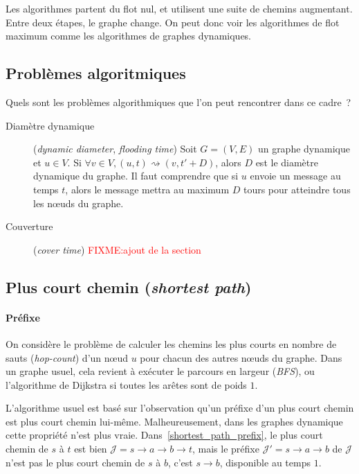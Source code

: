 \documentclass[12pt,a4paper]{article}
\begin{document}
Les algorithmes partent du flot nul, et utilisent une suite de chemins
augmentant. Entre deux étapes, le graphe change. On peut donc voir les
algorithmes de flot maximum comme les algorithmes de graphes
dynamiques.

\subsection{Problèmes algoritmiques}

Quels sont les problèmes algorithmiques que l'on peut rencontrer dans
ce cadre~?

\begin{description}
\item[Diamètre dynamique] (\textit{dynamic diameter}, \textit{flooding
    time}) Soit \(G = (V, E)\) un graphe dynamique et \(u \in V\). Si
  \(\forall v \in V, (u, t) \rightsquigarrow (v, t' + D)\), alors
  \(D\) est le diamètre dynamique du graphe. Il faut comprendre que si
  \(u\) envoie un message au temps \(t\), alors le message mettra au
  maximum \(D\) tours pour atteindre tous les nœuds du graphe.
\item[Couverture] (\textit{cover time}) \textcolor{red}{FIXME:\@ ajout
    de la section}
\end{description}

\subsection{Plus court chemin (\textit{shortest path})}

\paragraph{Préfixe}
On considère le problème de calculer les chemins les plus courts en
nombre de sauts (\textit{hop-count}) d'un nœud \(u\) pour chacun des
autres nœuds du graphe. Dans un graphe usuel, cela revient à exécuter
le parcours en largeur (\textit{BFS}), ou l'algorithme de Dijkstra si
toutes les arêtes sont de poids \(1\).

L'algorithme usuel est basé sur l'observation qu'un préfixe d'un plus
court chemin est plus court chemin lui-même. Malheureusement, dans les
graphes dynamique cette propriété n'est plus
vraie. Dans~\ref{shortest_path_prefix}, le plus court chemin de \(s\)
à \(t\) est bien
\(\mathcal{J} = s \rightarrow a \rightarrow b \rightarrow t\), mais le
préfixe \(\mathcal{J'} = s \rightarrow a \rightarrow b\) de
\(\mathcal{J}\) n'est pas le plus court chemin de \(s\) à \(b\), c'est
\(s \rightarrow b\), disponible au temps \(1\).
\end{document}
